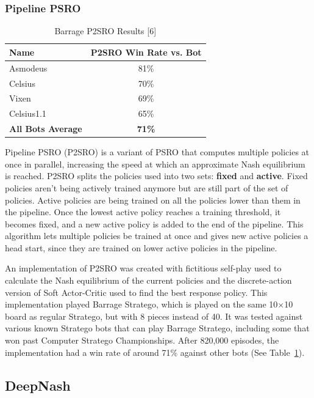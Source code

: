 \documentclass{article}
\begin{document}
\subsubsection{Pipeline PSRO}

\begin{table}
  \caption{Barrage P2SRO Results [6]}
  \label{p2sro-results}
  \centering
  \begin{tabular}{lc}
    \toprule
    Name		& P2SRO Win Rate vs. Bot \\ \midrule
    Asmodeus		& 81\% \\
    Celsius		& 70\% \\
    Vixen		& 69\% \\
    Celsius1.1 	& 65\% \\
    \textbf{All Bots Average} 	& \textbf{71\%} \\
    \bottomrule
  \end{tabular}
\end{table}

Pipeline PSRO (P2SRO) is a variant of PSRO that computes multiple policies at once in parallel, increasing the speed at which an approximate Nash equilibrium is reached. 
P2SRO splits the policies used into two sets: \textbf{fixed} and \textbf{active}. Fixed policies aren’t being actively trained anymore but are still part of the set of policies. 
Active policies are being trained on all the policies lower than them in the pipeline. 
Once the lowest active policy reaches a training threshold, it becomes fixed, and a new active policy is added to the end of the pipeline. 
This algorithm lets multiple policies be trained at once and gives new active policies a head start, since they are trained on lower active policies in the pipeline.

An implementation of P2SRO was created with fictitious self-play used to calculate the Nash equilibrium of the current policies and the discrete-action version of Soft Actor-Critic used to find the best response policy. 
This implementation played Barrage Stratego, which is played on the same 10$\times$10 board as regular Stratego, but with 8 pieces instead of 40.  
It was tested against various known Stratego bots that can play Barrage Stratego, including some that won past Computer Stratego Championships. 
After 820,000 episodes, the implementation had a win rate of around 71\% against other bots (See Table~\ref{p2sro-results}). 

\subsection{DeepNash}
\end{document}
